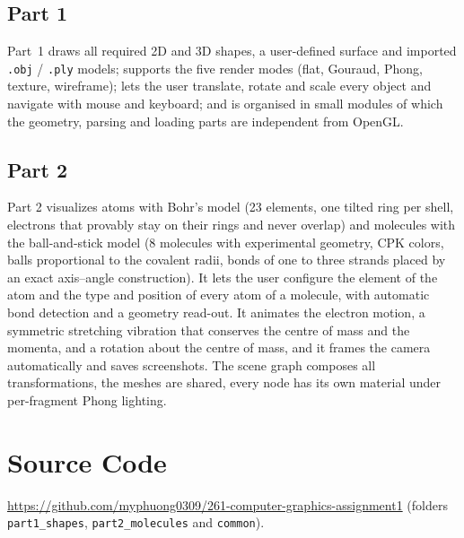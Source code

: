 \documentclass[a4paper, 11pt]{article}
\newcommand{\code}[1]{\texttt{#1}}
\begin{document}
\subsection{Part 1}
Part~1 draws all required 2D and 3D shapes, a user-defined surface and imported \code{.obj} / \code{.ply} models; supports the five render modes
(flat, Gouraud, Phong, texture, wireframe); lets the user translate, rotate and scale every object and navigate with mouse and keyboard; and is organised in small modules of which the geometry,
parsing and loading parts are independent from OpenGL.

\subsection{Part 2}
Part 2 visualizes atoms with Bohr's model (23 elements, one tilted ring per shell, electrons that provably stay on their rings and never overlap)
and molecules with the ball-and-stick model (8 molecules with experimental geometry, CPK colors, balls proportional to the covalent radii, bonds of
one to three strands placed by an exact axis--angle construction). It lets the user configure the element of the atom and the type and position of
every atom of a molecule, with automatic bond detection and a geometry read-out. It animates the electron motion, a symmetric stretching vibration
that conserves the centre of mass and the momenta, and a rotation about the centre of mass, and it frames the camera automatically and saves
screenshots. The scene graph composes all transformations, the meshes are shared, every node has its own material under per-fragment Phong
lighting.


\section{Source Code}
\url{https://github.com/myphuong0309/261-computer-graphics-assignment1} (folders \code{part1\_shapes}, \code{part2\_molecules} and \code{common}).
\end{document}
